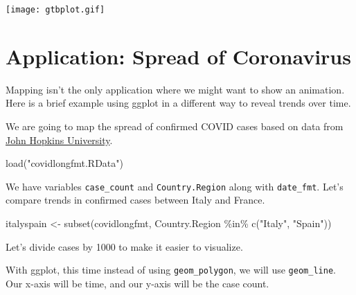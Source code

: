 \documentclass[
  letterpaper,
  DIV=11,
  numbers=noendperiod]{scrreprt}
\newenvironment{Shaded}{\begin{snugshade}}{\end{snugshade}}
\newcommand{\DecValTok}[1]{\textcolor[rgb]{0.68,0.00,0.00}{#1}}
\newcommand{\FunctionTok}[1]{\textcolor[rgb]{0.28,0.35,0.67}{#1}}
\newcommand{\NormalTok}[1]{\textcolor[rgb]{0.00,0.23,0.31}{#1}}
\newcommand{\OtherTok}[1]{\textcolor[rgb]{0.00,0.23,0.31}{#1}}
\newcommand{\SpecialCharTok}[1]{\textcolor[rgb]{0.37,0.37,0.37}{#1}}
\newcommand{\StringTok}[1]{\textcolor[rgb]{0.13,0.47,0.30}{#1}}
\begin{document}
\texttt{[image: gtbplot.gif]}

\hypertarget{application-spread-of-coronavirus}{%
\section{Application: Spread of
Coronavirus}\label{application-spread-of-coronavirus}}

Mapping isn't the only application where we might want to show an
animation. Here is a brief example using ggplot in a different way to
reveal trends over time.

We are going to map the spread of confirmed COVID cases based on data
from \href{https://github.com/CSSEGISandData/COVID-19}{John Hopkins
University}.

\begin{Shaded}
\begin{Highlighting}[]
\FunctionTok{load}\NormalTok{(}\StringTok{"covidlongfmt.RData"}\NormalTok{)}
\end{Highlighting}
\end{Shaded}

We have variables \texttt{case\_count} and \texttt{Country.Region} along
with \texttt{date\_fmt}. Let's compare trends in confirmed cases between
Italy and France.

\begin{Shaded}
\begin{Highlighting}[]
\NormalTok{italyspain }\OtherTok{\textless{}{-}} \FunctionTok{subset}\NormalTok{(covidlongfmt, Country.Region }\SpecialCharTok{\%in\%} \FunctionTok{c}\NormalTok{(}\StringTok{"Italy"}\NormalTok{, }\StringTok{"Spain"}\NormalTok{))}
\end{Highlighting}
\end{Shaded}

Let's divide cases by 1000 to make it easier to visualize.

\begin{Shaded}
\end{Shaded}

With ggplot, this time instead of using \texttt{geom\_polygon}, we will
use \texttt{geom\_line}. Our x-axis will be time, and our y-axis will be
the case count.
\end{document}
